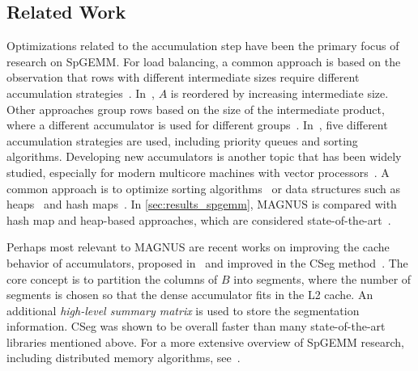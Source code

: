 \subsection{Related Work}
Optimizations related to the accumulation step have been the primary focus of research on SpGEMM.
For load balancing, a common approach is based on the observation that rows with different intermediate sizes require different accumulation strategies~\cite{liu1,liu2,ESC,pbSpGEMM,liu3,OpSparse,spECK,nagasaka3}.
In~\cite{ESC}, $A$ is reordered by increasing intermediate size.
Other approaches group rows based on the size of the intermediate product, where a different accumulator is used for different groups~\cite{liu1,liu2,liu3,OpSparse,spECK,nagasaka3,adaptLoadBalanceGPU}.
In~\cite{liu2}, five different accumulation strategies are used, including priority queues and sorting algorithms.
Developing new accumulators is another topic that has been widely studied, especially for modern multicore machines with vector processors~\cite{fevre,hierRowMerging,ASA,AVX512sort,nagasaka1,nagasaka2,gamma}.
A common approach is to optimize sorting algorithms~\cite{ESC,tricount3,liu1,AVX512sort,pbSpGEMM,registerAware}
or data structures such as heaps~\cite{azad,nagasaka1,nagasaka2} and hash maps~\cite{nagasaka1,nagasaka2,cuSPARSE,registerAware,mcl,balancedHashing,kokkos}.
In \autoref{sec:results_spgemm}, MAGNUS is compared with hash map and heap-based approaches, which are considered state-of-the-art~\cite{cseg,nagasaka1,nagasaka2,mkl}.


Perhaps most relevant to MAGNUS are recent works on improving the cache behavior of accumulators,
proposed in~\cite{partway} and improved in the CSeg method~\cite{cseg}.
The core concept is to partition the columns of $B$ into segments, where the number of segments is chosen so that the dense accumulator fits in the L2 cache.
An additional \emph{high-level summary matrix} is used to store the segmentation information. 
CSeg was shown to be overall faster than many state-of-the-art libraries mentioned above.
For a more extensive overview of SpGEMM research, including distributed memory algorithms, see~\cite{spgemmSurvey}.
